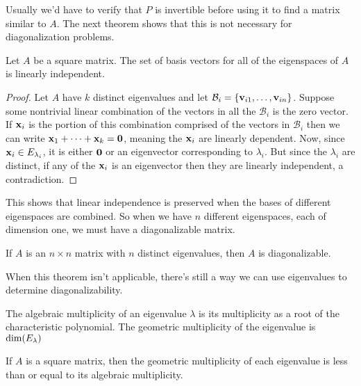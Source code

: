 \documentclass[../m073main.tex]{subfiles}
\begin{document}
Usually we'd have to verify that $P$ is invertible before using it to find a matrix similar to $A$.
The next theorem shows that this is not necessary for diagonalization problems.

\begin{theorem}
	Let $A$ be a square matrix.
	The set of basis vectors for all of the eigenspaces of $A$ is linearly independent.
\end{theorem}

\begin{proof}
	Let $A$ have $k$ distinct eigenvalues and let $\mathcal B_i = \left\{ \mathbf{v}_{i1}, \ldots, \mathbf{v}_{in} \right\}$.
	Suppose some nontrivial linear combination of the vectors in all the $\mathcal B_i$ is the zero vector.
	If $\mathbf{x}_i$ is the portion of this combination comprised of the vectors in $\mathcal B_i$ then we can write $\mathbf{x}_1 + \cdots + \mathbf{x}_k = \mathbf{0}$, meaning the $\mathbf{x}_i$ are linearly dependent.
	Now, since $\mathbf{x}_i \in E_{\lambda_i}$, it is either $\mathbf{0}$ or an eigenvector corresponding to $\lambda_i$.
	But since the $\lambda_i$ are distinct, if any of the $\mathbf{x}_i$ is an eigenvector then they are linearly independent, a contradiction.
\end{proof}

This shows that linear independence is preserved when the bases of different eigenspaces are combined.
So when we have $n$ different eigenspaces, each of dimension one, we must have a diagonalizable matrix.

\begin{theorem}
	If $A$ is an $n \times n$ matrix with $n$ distinct eigenvalues, then $A$ is diagonalizable.
\end{theorem}

When this theorem isn't applicable, there's still a way we can use eigenvalues to determine diagonalizability.

\begin{definition}
	The algebraic multiplicity of an eigenvalue $\lambda$ is its multiplicity as a root of the characteristic polynomial.
	The geometric multiplicity of the eigenvalue is $\operatorname{dim} (E_\lambda)$
\end{definition}

\begin{lemma}
	If $A$ is a square matrix, then the geometric multiplicity of each eigenvalue is less than or equal to its algebraic multiplicity.
\end{lemma}
\end{document}
